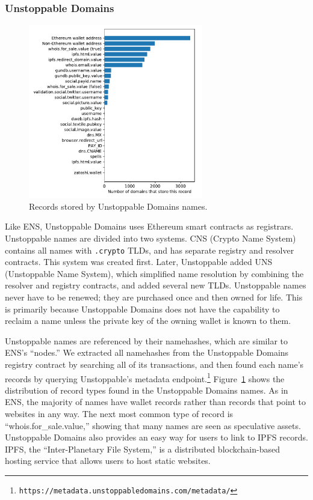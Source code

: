 \subsubsection{Unstoppable Domains}

\begin{figure}[t]
	\centering
	\includegraphics[width=3in]{figs/all_unstoppable_records.pdf}
	\caption{Records stored by Unstoppable Domains names.}
	\label{fig:unstoppable_records}
\end{figure}


Like ENS, Unstoppable Domains uses Ethereum smart contracts as 
registrars. Unstoppable names are divided into two systems. CNS 
(Crypto Name System) contains all names with \texttt{.crypto} 
TLDs, and has separate registry and resolver contracts. This 
system was created first. Later, Unstoppable added UNS 
(Unstoppable Name System), which simplified name resolution by 
combining the resolver and registry contracts, and added several 
new TLDs. Unstoppable names never have to be renewed; they are 
purchased once and then owned for life. This is primarily 
because Unstoppable Domains does not have the capability to 
reclaim a name unless the private key of the owning wallet is 
known to them. 

Unstoppable names are referenced by their namehashes, which are 
similar to ENS's ``nodes.'' We extracted all namehashes from the 
Unstoppable Domains registry contract by searching all of its 
transactions, and then found each name's records by querying 
Unstoppable's metadata endpoint.\footnote{
	\texttt{https://metadata.unstoppabledomains.com/metadata/}} 
Figure~\ref{fig:unstoppable_records} shows the 
distribution 
of record types found in the Unstoppable Domains names. As in 
ENS, the majority of names have wallet records rather than 
records that point to websites in any way. The next most common 
type of record is ``whois.for\_sale.value,'' showing that many 
names are seen as speculative assets. Unstoppable Domains also 
provides an easy way for users to link to IPFS records. IPFS, 
the ``Inter-Planetary File System,'' is a distributed 
blockchain-based hosting service that allows users to host 
static websites.


